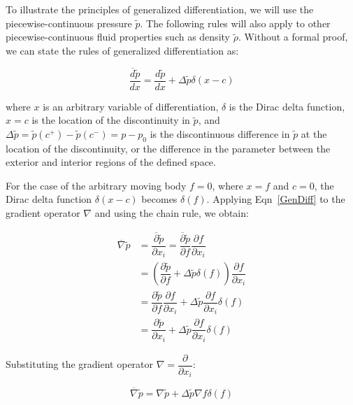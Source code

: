 \documentclass[]{aiaa-tc}%
\begin{document}
To illustrate the principles of generalized differentiation, we will use the piecewise-continuous pressure $\widetilde{p}$.  The following rules will also apply to other piecewise-continuous fluid properties such as density $\widetilde{\rho}$. Without a formal proof, we can state the rules of generalized differentiation as:

\begin{equation} \label{GenDiff}
\dfrac{\overline{d}\widetilde{p}}{dx}
    = \dfrac{d\widetilde{p}}{dx} + \Delta\widetilde{p} \delta(x - c)
\end{equation}

\noindent where $x$ is an arbitrary variable of differentiation, $\delta$ is the Dirac delta function, $x=c$ is the location of the discontinuity in $\widetilde{p}$, and $\Delta\widetilde{p}=\widetilde{p}(c^+)-\widetilde{p}(c^-)=p - p_0$ is the discontinuous difference in $\widetilde{p}$ at the location of the discontinuity, or the difference in the parameter between the exterior and interior regions of the defined space.

For the case of the arbitrary moving body $f=0$, where $x=f$ and $c=0$, the Dirac delta function $\delta(x-c)$ becomes $\delta(f)$.  Applying Eqn~\ref{GenDiff} to the gradient operator $\nabla$ and using the chain rule, we obtain:

\begin{align*}
\overline{\nabla} \widetilde{p}
&= \dfrac{\overline{\partial}\widetilde{p}}{\partial x_i}
= \dfrac{\overline{\partial}\widetilde{p}}{\partial f}
    \dfrac{\partial f}{\partial x_i} \\
&= \left( \dfrac{\partial\widetilde{p}}{\partial f}
    + \Delta \widetilde{p} \delta(f) \right)
    \dfrac{\partial f}{\partial x_i} \\
&= \dfrac{\partial\widetilde{p}}{\partial f} \dfrac{\partial f}{\partial x_i}
    + \Delta \widetilde{p} \dfrac{\partial f}{\partial x_i} \delta(f) \\
&= \dfrac{\partial\widetilde{p}}{\partial x_i}
    + \Delta \widetilde{p} \dfrac{\partial f}{\partial x_i} \delta(f)
\end{align*}

\noindent Substituting the gradient operator $\nabla = \dfrac{\partial}{\partial x_i}$:

\begin{equation} \label{GenGrad}
\overline{\nabla} \widetilde{p}
= \nabla\widetilde{p} + \Delta\widetilde{p} \nabla f \delta(f)
\end{equation}
\end{document}
